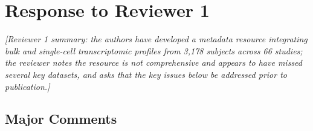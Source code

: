 \documentclass[11pt]{article}
\begin{document}
\clearpage
\section*{Response to Reviewer 1}

\noindent\textit{[Reviewer 1 summary: the authors have developed a metadata resource integrating
bulk and single-cell transcriptomic profiles from 3,178 subjects across 66 studies; the reviewer
notes the resource is not comprehensive and appears to have missed several key datasets, and asks
that the key issues below be addressed prior to publication.]}

\bigskip
\subsection*{Major Comments}
\end{document}
